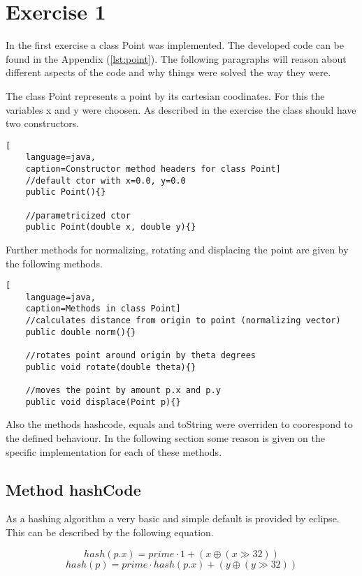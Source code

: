 \chapter{Exercise 1}

In the first exercise a class Point was implemented. The developed code can be found in the Appendix (\ref{lst:point}). The following paragraphs will reason about different aspects of the code and why things were solved the way they were.

The class Point represents a point by its cartesian coodinates. For this the variables x and y were choosen. As described in the exercise the class should have two constructors.

\begin{lstlisting}[
    language=java,
    caption=Constructor method headers for class Point]
    //default ctor with x=0.0, y=0.0
    public Point(){}

    //parametricized ctor
    public Point(double x, double y){}
\end{lstlisting}

Further methods for normalizing, rotating and displacing the point are given by the following methods.

\begin{lstlisting}[
    language=java,
    caption=Methods in class Point]
    //calculates distance from origin to point (normalizing vector)
    public double norm(){}

    //rotates point around origin by theta degrees
    public void rotate(double theta){}

    //moves the point by amount p.x and p.y
    public void displace(Point p){}
\end{lstlisting}

Also the methods hashcode, equals and toString were overriden to coorespond to the defined behaviour. In the following section some reason is given on the specific implementation for each of these methods.

\section{Method hashCode}
As a hashing algorithm a very basic and simple default is provided by eclipse. This can be described by the following equation.

\begin{displaymath}
    hash(p.x) = prime \cdot 1 + (x \oplus (x \gg 32))
\end{displaymath}
\begin{displaymath}
    hash(p) = prime \cdot hash(p.x) + (y \oplus (y \gg 32))
\end{displaymath}

